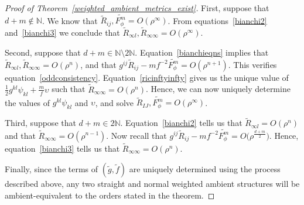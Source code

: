 \documentclass[11pt]{article}
\numberwithin{equation}{section}
\numberwithin{equation}{section}
\begin{document}
\begin{proof}[Proof of Theorem~\ref{weighted_ambient_metrics_exist}]
First, suppose that $d+m\notin\mathbb{N}$. We know that $\widetilde{R}_{ij},\widetilde{F_\phi^m}=O(\rho^\infty)$. From equations~\eqref{bianchi2} and~\eqref{bianchi3} we conclude that $\widetilde{R}_{\infty l},\widetilde{R}_{\infty\infty}=O(\rho^\infty)$.

Second, suppose that $d+m\in \mathbb{N}\setminus 2\mathbb{N}$. Equation~\eqref{bianchieqns} implies that $\widetilde{R}_{\infty l},\widetilde{R}_{\infty\infty}=O(\rho^{n})$, and that $g^{ij}\widetilde{R}_{ij}-mf^{-2}\widetilde{F_\phi^m}=O(\rho^{n+1})$. This verifies equation~\eqref{oddconsistency}. Equation~\eqref{ricinftyinfty} gives us the unique value of $\frac{1}{2}g^{kl}\psi_{kl}+\frac{m}{f}\upsilon$ such that $\widetilde{R}_{\infty\infty}=O(\rho^{n})$. Hence, we can now uniquely determine the values of $g^{kl}\psi_{kl}$ and $\upsilon$, and solve $\widetilde{R}_{IJ},\widetilde{F_\phi^m}=O(\rho^\infty)$.

Third, suppose that $d+m\in 2\mathbb{N}$. Equation~\eqref{bianchi2} tells us that $\widetilde{R}_{\infty l}=O(\rho^n)$ and that $\widetilde{R}_{\infty\infty}=O(\rho^{n-1})$. Now recall that $g^{ij}\widetilde{R}_{ij}-mf^{-2}\widetilde{F_\phi^m}=O\big(\rho^{\frac{d+m}{2}}\big)$.
Hence, equation~\eqref{bianchi3} tells us that $\widetilde{R}_{\infty\infty}=O(\rho^n)$.

Finally, since the terms of $(\widetilde{g},\widetilde{f})$ are uniquely determined using the process described above, any two straight and normal weighted ambient structures will be ambient-equivalent to the orders stated in the theorem.
\end{proof}
\end{document}
